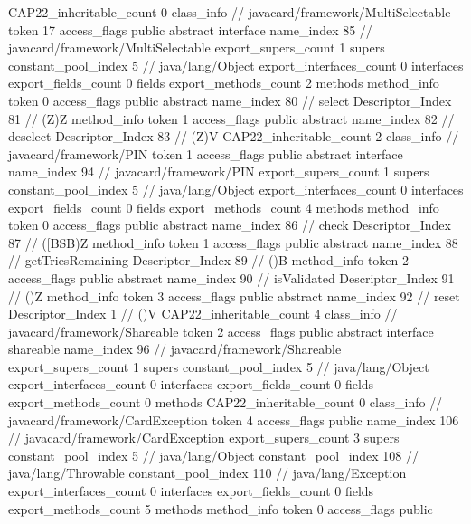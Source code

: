 {{{{			}
			CAP22_inheritable_count	0
		}
		class_info {		// javacard/framework/MultiSelectable
			token	17
			access_flags	public abstract interface
			name_index	85		// javacard/framework/MultiSelectable
			export_supers_count	1
			supers {
				constant_pool_index	5		// java/lang/Object
			}
			export_interfaces_count	0
			interfaces {
			}
			export_fields_count	0
			fields {
			}
			export_methods_count	2
			methods {
				method_info {
					token	0
					access_flags	public abstract
					name_index	80		// select
					Descriptor_Index	81		// (Z)Z
				}
				method_info {
					token	1
					access_flags	public abstract
					name_index	82		// deselect
					Descriptor_Index	83		// (Z)V
				}
			}
			CAP22_inheritable_count	2
		}
		class_info {		// javacard/framework/PIN
			token	1
			access_flags	public abstract interface
			name_index	94		// javacard/framework/PIN
			export_supers_count	1
			supers {
				constant_pool_index	5		// java/lang/Object
			}
			export_interfaces_count	0
			interfaces {
			}
			export_fields_count	0
			fields {
			}
			export_methods_count	4
			methods {
				method_info {
					token	0
					access_flags	public abstract
					name_index	86		// check
					Descriptor_Index	87		// ([BSB)Z
				}
				method_info {
					token	1
					access_flags	public abstract
					name_index	88		// getTriesRemaining
					Descriptor_Index	89		// ()B
				}
				method_info {
					token	2
					access_flags	public abstract
					name_index	90		// isValidated
					Descriptor_Index	91		// ()Z
				}
				method_info {
					token	3
					access_flags	public abstract
					name_index	92		// reset
					Descriptor_Index	1		// ()V
				}
			}
			CAP22_inheritable_count	4
		}
		class_info {		// javacard/framework/Shareable
			token	2
			access_flags	public abstract interface shareable
			name_index	96		// javacard/framework/Shareable
			export_supers_count	1
			supers {
				constant_pool_index	5		// java/lang/Object
			}
			export_interfaces_count	0
			interfaces {
			}
			export_fields_count	0
			fields {
			}
			export_methods_count	0
			methods {
			}
			CAP22_inheritable_count	0
		}
		class_info {		// javacard/framework/CardException
			token	4
			access_flags	public
			name_index	106		// javacard/framework/CardException
			export_supers_count	3
			supers {
				constant_pool_index	5		// java/lang/Object
				constant_pool_index	108		// java/lang/Throwable
				constant_pool_index	110		// java/lang/Exception
			}
			export_interfaces_count	0
			interfaces {
			}
			export_fields_count	0
			fields {
			}
			export_methods_count	5
			methods {
				method_info {
					token	0
					access_flags	public
}}}}}
